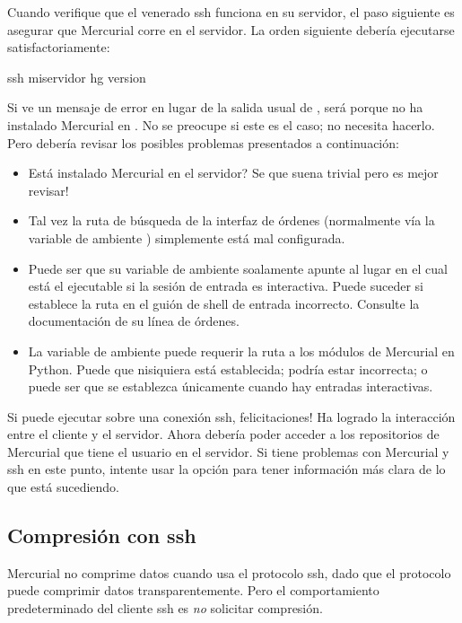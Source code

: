 Cuando verifique que el venerado ssh funciona en su servidor, el
paso siguiente es asegurar que Mercurial corre en el servidor.  La
orden siguiente debería ejecutarse satisfactoriamente:
\begin{codesample2}
  ssh miservidor hg version
\end{codesample2}
Si ve un mensaje de error en lugar de la salida usual de 
, será porque no ha instalado Mercurial en
.  No se preocupe si este es el caso; no necesita
hacerlo.  Pero debería revisar los posibles problemas presentados a
continuación:
\begin{itemize}
\item Está instalado Mercurial en el servidor?  Se que suena trivial
  pero es mejor revisar!
\item Tal vez la ruta de búsqueda de la interfaz de órdenes
  (normalmente vía la variable de ambiente ) simplemente
  está mal configurada.
\item Puede ser que su variable de ambiente  soalamente
  apunte al lugar en el cual está el ejecutable  si la
  sesión de entrada es interactiva.  Puede suceder si establece la
  ruta en el guión de shell de entrada incorrecto.  Consulte la
  documentación de su línea de órdenes.
\item La variable de ambiente  puede requerir la
  ruta a los módulos de Mercurial en Python.  Puede que nisiquiera
  está establecida; podría estar incorrecta; o puede ser que se
  establezca únicamente cuando hay entradas interactivas.
\end{itemize}

Si puede ejecutar  sobre una conexión ssh,
felicitaciones!  Ha logrado la interacción entre el cliente y el 
servidor.  Ahora debería poder acceder a los repositorios de
Mercurial que tiene el usuario en el servidor.  Si tiene problemas
con Mercurial y ssh en este punto, intente usar la opción
 para tener información más clara de lo que está
sucediendo.

\subsection{Compresión con ssh}

Mercurial no comprime datos cuando usa el protocolo ssh, dado que
el protocolo puede comprimir datos transparentemente.  Pero el
comportamiento predeterminado del cliente ssh es \emph{no}
solicitar compresión.

